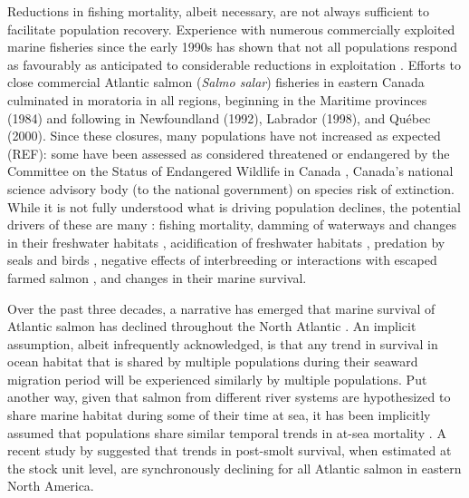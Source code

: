 \documentclass[12pt]{article}
\begin{document}
Reductions in fishing mortality, albeit necessary, are not always sufficient
to facilitate population recovery. Experience with numerous commercially
exploited marine fisheries since the early 1990s has shown that not all
populations respond as favourably as anticipated to considerable reductions in
exploitation \citep{Hutchings2017}. Efforts to close commercial
Atlantic salmon (\emph{Salmo salar}) fisheries in eastern Canada culminated in
moratoria in all regions, beginning in the Maritime provinces (1984) and
following in Newfoundland (1992), Labrador (1998), and Québec (2000). Since
these closures, many populations have not increased as expected (REF): some 
have been assessed as considered threatened or endangered by the 
Committee on the Status of Endangered Wildlife in Canada \citep[COSEWIC, ][]{Cosewic2010}, 
Canada’s national science advisory body (to the national government) on species risk of extinction.
While it is not fully understood what is driving population declines, the potential
drivers of these are many \citep[see ][for a detailed discussion of possible
causes]{Cairns2001}: fishing mortality, damming of waterways
and changes in their freshwater habitats \citep{Dunfield1985}, acidification
of freshwater habitats \citep[particularly in the Southern Uplands region of
NS, see][]{Gibson2010}, predation by seals and birds \citep{Cairns2000}, negative
effects of interbreeding or interactions with escaped farmed salmon
\citep{Keyser2018}, and changes in their marine survival.


Over the past three decades, a narrative has emerged that marine survival of Atlantic salmon has
declined throughout the North Atlantic \citep{Hansen1998,OMaoileidigh2003,Chaput2012a}. 
An implicit assumption, albeit infrequently acknowledged, is that any trend in
survival in ocean habitat that is shared by multiple populations during their
seaward migration period will be experienced similarly by multiple
populations. Put another way, given that salmon from different river systems
are hypothesized to share marine habitat during some of their time at sea, it
has been implicitly assumed that populations share similar temporal trends in
at-sea mortality \citep{Friedland1993, Friedland1998}.  
A recent study by \citet{Olmos2019} suggested that trends in post-smolt
survival, when estimated at the stock unit level, are synchronously declining
for all Atlantic salmon in eastern North America.

\end{document}
